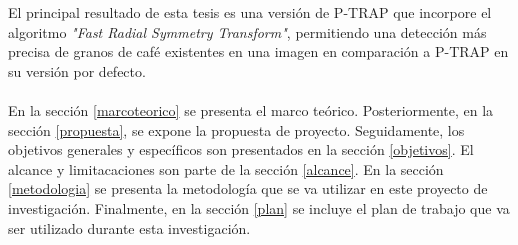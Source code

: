 El principal resultado de esta tesis es una versi\'on de P-TRAP\cite{ptrap} que incorpore el algoritmo \textit{"Fast Radial Symmetry Transform"}\cite{loyzelinsky}, permitiendo una detecci\'on m\'as precisa de granos de caf\'e existentes en una imagen en comparaci\'on a P-TRAP\cite{ptrap} en su versi\'on por defecto. 
\\\\
En la secci\'on \ref{marcoteorico} se presenta el marco te\'orico. Posteriormente, en la secci\'on \ref{propuesta}, se expone la propuesta de proyecto. Seguidamente, los objetivos generales y espec\'ificos son presentados en la secci\'on \ref{objetivos}. El alcance y limitacaciones son parte de la secci\'on \ref{alcance}. En la secci\'on \ref{metodologia} se presenta la metodolog\'ia que se va utilizar en este proyecto de investigaci\'on. Finalmente, en la secci\'on \ref{plan} se incluye el plan de trabajo que va ser utilizado durante esta investigaci\'on.



